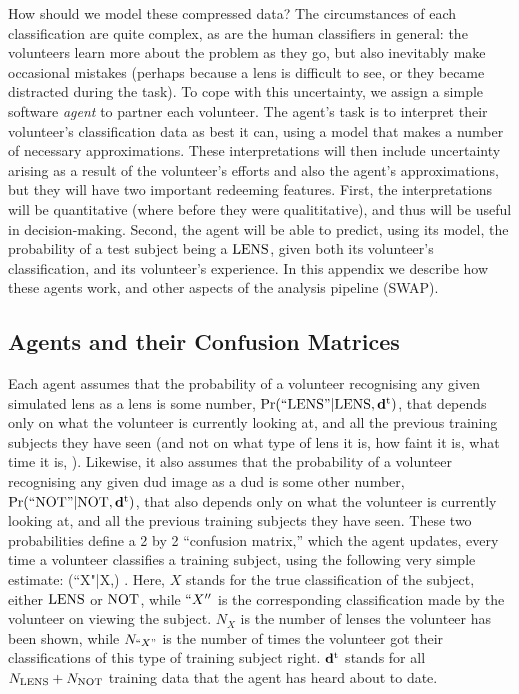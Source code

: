 \documentclass[useAMS,usenatbib,a4paper]{mn2e}
\begin{document}
How should we model these compressed data? The circumstances of each
classification are quite complex, as are the human classifiers in general: the
volunteers learn more about the problem as they go, but also inevitably make
occasional mistakes (perhaps because a lens is difficult to see, or they
became distracted during the task). To cope with this uncertainty, we assign a
simple software {\it agent} to partner each volunteer. The agent's task is to
interpret their volunteer's classification data as best it can, using a model
that makes a number of necessary approximations. These interpretations will
then include uncertainty arising as a result of the volunteer's efforts and
also the agent's approximations, but they will have two important redeeming
features. First, the interpretations will be quantitative (where before they
were qualititative),  and thus will be useful in decision-making. Second, the
agent will be able to predict, using its model, the probability of a test
subject being a ${\rm LENS}$, given both its volunteer's classification, and its
volunteer's experience. In this appendix we describe how these agents work,
and other aspects of the \sw analysis pipeline (SWAP).


\subsection{Agents and their Confusion Matrices}
\label{appendix:swap:probabilities}

Each agent assumes that the probability of a volunteer recognising any given
simulated lens as a lens is some number, ${\rm Pr}({\rm ``LENS"}|{\rm LENS},{\mathbf{d}^{\rm t}})$, that
depends only on what the volunteer is currently looking at, and all the
previous training subjects they have seen (and not on what type of lens it is,
how faint it is, what time it is, \etc). Likewise, it also assumes that the
probability of a volunteer recognising any given dud image as a dud is some
other number, ${\rm Pr}({\rm ``NOT"}|{\rm NOT},{\mathbf{d}^{\rm t}})$, that also depends only on what the volunteer is currently looking at, and all the
previous training subjects they have seen. These two probabilities define a 
2 by 2 ``confusion matrix,'' which the agent updates, every time a
volunteer classifies a training subject, using the following 
very simple estimate:
\be
  \pr(``X"|X,\training) \approx {}.
  \label{eq:app:fraction}
\ee
Here, $X$ stands for the true classification of the subject, \ie either
${\rm LENS}$ or ${\rm NOT}$, while $``X''$ is the corresponding classification
made by the volunteer on viewing the subject. $N_X$ is the number of
lenses the volunteer has been shown, while $N_{``X"}$ is the number of 
times the volunteer got their classifications of this type of training subject
right. ${\mathbf{d}^{\rm t}}$ stands for all
$N_{{\rm LENS}} + N_{{\rm NOT}}$ training data that the agent has heard about to
date. 
\end{document}
